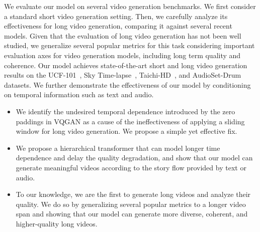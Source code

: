We evaluate our model on several video generation benchmarks. 
We first consider a standard short video generation setting. 
Then, we carefully analyze its effectiveness for long video generation, comparing it against several recent models. 
Given that the evaluation of long video generation has not been well studied, we generalize several popular metrics for this task considering important evaluation axes for video generation models, including long term quality and coherence.
Our model achieves state-of-the-art short and long video generation results on the UCF-101~\cite{soomro2012ucf101}, Sky Time-lapse~\cite{xiong2018learning}, Taichi-HD~\cite{siarohin2019first}, and AudioSet-Drum~\cite{gemmeke2017audio} datasets.
We further demonstrate the effectiveness of our model by conditioning on temporal information such as text and audio. 

\begin{itemize}
    \item We identify the undesired temporal dependence introduced by the zero paddings in VQGAN as a cause of the ineffectiveness of applying a sliding window for long video generation. We propose a simple yet effective fix.
    \item We propose a hierarchical transformer that can model longer time dependence and delay the quality degradation, and show that our model can generate meaningful videos according to the story flow provided by text or audio. 
    \item To our knowledge, we are the first to generate long videos and analyze their quality. We do so by generalizing several popular metrics to a longer video span and showing that our model can generate more diverse, coherent, and higher-quality long videos.
\end{itemize}

